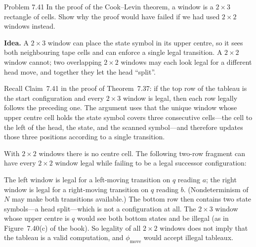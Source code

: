 \begin{question}{Problem 7.41}
In the proof of the Cook--Levin theorem, a window is a $2\times 3$ rectangle of cells. Show why the proof would have failed if we had used $2\times 2$ windows instead.
\end{question}
\begin{soln}
\textbf{Idea.} A $2\times 3$ window can place the state symbol in its upper centre, so it sees both neighbouring tape cells and can enforce a single legal transition. A $2\times 2$ window cannot; two overlapping $2\times 2$ windows may each look legal for a different head move, and together they let the head ``split''.

Recall Claim~7.41 in the proof of Theorem~7.37: if the top row of the tableau is the start configuration and every $2\times 3$ window is legal, then each row legally follows the preceding one. The argument uses that the unique window whose upper centre cell holds the state symbol covers three consecutive cells---the cell to the left of the head, the state, and the scanned symbol---and therefore updates those three positions according to a single transition.

With $2\times 2$ windows there is no centre cell. The following two-row fragment can have every $2\times 2$ window legal while failing to be a legal successor configuration:
\begin{center}
\end{center}
The left window is legal for a left-moving transition on $q$ reading $a$; the right window is legal for a right-moving transition on $q$ reading $b$. (Nondeterminism of $N$ may make both transitions available.) The bottom row then contains two state symbols---a head split---which is not a configuration at all. The $2\times 3$ window whose upper centre is $q$ would see both bottom states and be illegal (as in Figure~7.40(c) of the book). So legality of all $2\times 2$ windows does not imply that the tableau is a valid computation, and $\phi_{\mathrm{move}}$ would accept illegal tableaux.
\end{soln}

